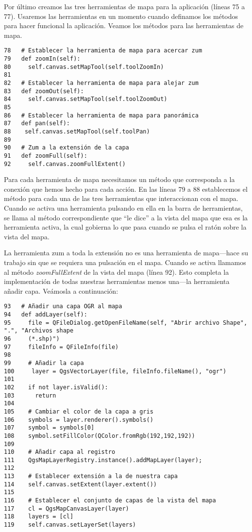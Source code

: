 Por último creamos las tres herramientas de mapa para la aplicación (líneas 75 a 77). Usaremos las herramientas en 
un momento cuando definamos los métodos para hacer funcional la aplicación. Veamos los métodos para las herramientas de mapa.

\begin{verbatim}
78   # Establecer la herramienta de mapa para acercar zum
79   def zoomIn(self):
80     self.canvas.setMapTool(self.toolZoomIn)
81 
82   # Establecer la herramienta de mapa para alejar zum
83   def zoomOut(self):
84     self.canvas.setMapTool(self.toolZoomOut)
85 
86   # Establecer la herramienta de mapa para panorámica 
87   def pan(self):
88    self.canvas.setMapTool(self.toolPan)
89 
90   # Zum a la extensión de la capa
91   def zoomFull(self):
92     self.canvas.zoomFullExtent()
\end{verbatim}

Para cada herramienta de mapa necesitamos un método que corresponda a la conexión que hemos hecho para 
cada acción. En las líneas 79 a 88 establecemos el método para cada una de las tres herramientas que interaccionan 
con el mapa. Cuando se activa una herramienta pulsando en ella en la barra de herramientas, se llama al método 
correspondiente que ``le dice'' a la vista del mapa que esa es la herramienta activa, la cual gobierna lo que 
pasa cuando se pulsa el ratón sobre la vista del mapa.

La herramienta zum a toda la extensión no es una herramienta de mapa---hace su trabajo sin que se requiera una 
pulsación en el mapa. Cuando se activa llamamos al método \textsl{zoomFullExtent} de la vista del mapa (línea 92). 
Esto completa la implementación de todas nuestras herramientas menos una---la herramienta añadir capa. Veámosla a continuación:

\begin{verbatim}
93   # Añadir una capa OGR al mapa
94   def addLayer(self):
95     file = QFileDialog.getOpenFileName(self, "Abrir archivo Shape", ".", "Archivos shape
96     (*.shp)")
97     fileInfo = QFileInfo(file)
98 
99     # Añadir la capa
100     layer = QgsVectorLayer(file, fileInfo.fileName(), "ogr")
101
102    if not layer.isValid():
103      return
104
105    # Cambiar el color de la capa a gris
106    symbols = layer.renderer().symbols()
107    symbol = symbols[0]
108    symbol.setFillColor(QColor.fromRgb(192,192,192))
109
110    # Añadir capa al registro
111    QgsMapLayerRegistry.instance().addMapLayer(layer);
112
113    # Establecer extensión a la de nuestra capa
114    self.canvas.setExtent(layer.extent())
115
116    # Establecer el conjunto de capas de la vista del mapa
117    cl = QgsMapCanvasLayer(layer)
118    layers = [cl]
119    self.canvas.setLayerSet(layers)
\end{verbatim}

